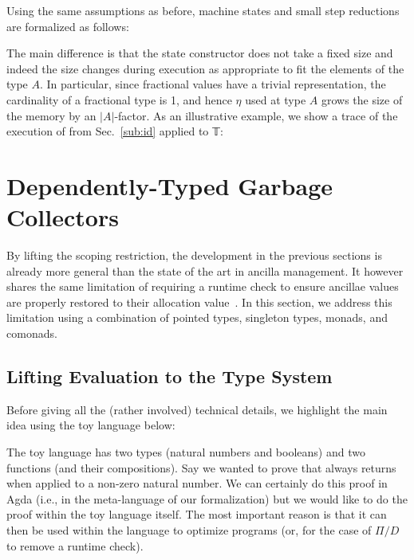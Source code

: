 \documentclass[sigplan,10pt,review,anonymous]{acmart}
\begin{document}
Using the same assumptions as before, machine states and small step
reductions are formalized as follows:

\PIFMEMstep{}

\vspace{-\baselineskip}

The main difference is that the state constructor does not take a
fixed size and indeed the size changes during execution as appropriate
to fit the elements of the type $A$. In particular, since fractional
values have a trivial representation, the cardinality of a fractional
type is 1, and hence $\eta$ used at type $A$ grows the size of the
memory by an $|A|$-factor. As an illustrative example,
we show a trace of the execution of 
from Sec.~\ref{sub:id} applied to 𝕋:

{\center}


\section{Dependently-Typed Garbage Collectors}
\label{sec:dep}

By lifting the scoping restriction, the development in the previous
sections is already more general than the state of the art in ancilla
management.  It however shares the same limitation of requiring a
runtime check to ensure ancillae values are properly restored to their
allocation
value~\cite{10.1007/978-3-319-20860-2_13,Green:2013:QSQ:2491956.2462177}.
In this section, we address this limitation using a combination of
pointed types, singleton types, monads, and comonads.

\subsection{Lifting Evaluation to the Type System}

Before giving all the (rather involved) technical details, we
highlight the main idea using the toy language below:

\Jexample{}

\vspace{-\baselineskip}

The toy language has two types (natural numbers and booleans) and two
functions (and their compositions). Say we wanted to prove that
 always returns
 when applied to a non-zero natural
number. We can certainly do this proof in Agda (i.e., in the
meta-language of our formalization) but we would like to do the proof
within the toy language itself. The most important reason is that it
can then be used within the language to optimize programs (or, for the
case of $\Pi/D$ to remove a runtime check).
\end{document}
